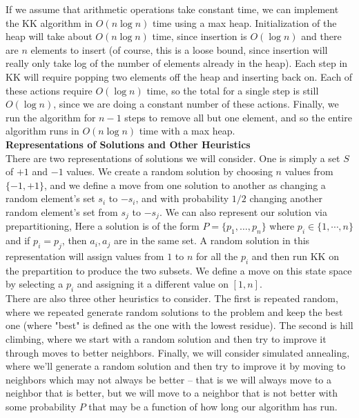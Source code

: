 \documentclass[12pt]{article}
\begin{document}
If we assume that arithmetic operations take constant time, we can implement the KK algorithm in $O(n \log n)$ time using a max heap. Initialization of the heap will take about $O(n \log n)$ time, since insertion is $O(\log n)$ and there are $n$ elements to insert (of course, this is a loose bound, since insertion will really only take log of the number of elements already in the heap). Each step in KK will require popping two elements off the heap and inserting back on. Each of these actions require $O(\log n)$ time, so the total for a single step is still $O(\log n)$, since we are doing a constant number of these actions. Finally, we run the algorithm for $n - 1$ steps to remove all but one element, and so the entire algorithm runs in $O(n \log n)$ time with a max heap. \\

\textbf{Representations of Solutions and Other Heuristics} \\
There are two representations of solutions we will consider. One is simply a set $S$ of $+1$ and $-1$ values. We create a random solution by choosing $n$ values from $\{-1, +1\}$, and we define a move from one solution to another as changing a random element's set $s_i$ to $-s_i$, and with probability $1/2$ changing another random element's set from $s_j$ to $-s_j$. We can also represent our solution via prepartitioning, Here a solution is of the form $P = \{p_1, \dots, p_n\}$ where $p_i \in \{1, \cdots, n\}$ and if $p_i = p_j$, then $a_i, a_j$ are in the same set. A random solution in this representation will assign values from $1$ to $n$ for all the $p_i$ and then run KK on the prepartition to produce the two subsets. We define a move on this state space by selecting a $p_i$ and assigning it a different value on $[1, n]$. \\

There are also three other heuristics to consider. The first is repeated random, where we repeated generate random solutions to the problem and keep the best one (where "best" is defined as the one with the lowest residue). The second is hill climbing, where we start with a random solution and then try to improve it through moves to better neighbors. Finally, we will consider simulated annealing, where we'll generate a random solution and then try to improve it by moving to neighbors which may not always be better -- that is we will always move to a neighbor that is better, but we will move to a neighbor that is not better with some probability $P$ that may be a function of how long our algorithm has run. \\
\end{document}
